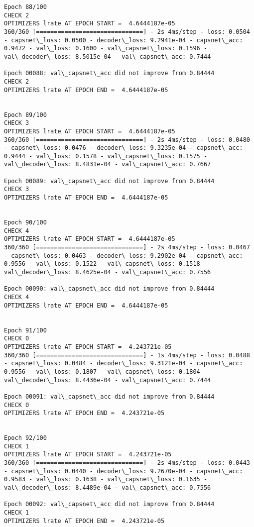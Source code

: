 \documentclass[11pt]{article}
\begin{document}
\begin{Verbatim}[commandchars=\\\{\}]
Epoch 88/100
CHECK 2
OPTIMIZERS lrate AT EPOCH START =  4.6444187e-05
360/360 [==============================] - 2s 4ms/step - loss: 0.0504 - capsnet\_loss: 0.0500 - decoder\_loss: 9.2941e-04 - capsnet\_acc: 0.9472 - val\_loss: 0.1600 - val\_capsnet\_loss: 0.1596 - val\_decoder\_loss: 8.5015e-04 - val\_capsnet\_acc: 0.7444

Epoch 00088: val\_capsnet\_acc did not improve from 0.84444
CHECK 2
OPTIMIZERS lrate AT EPOCH END =  4.6444187e-05 


Epoch 89/100
CHECK 3
OPTIMIZERS lrate AT EPOCH START =  4.6444187e-05
360/360 [==============================] - 2s 4ms/step - loss: 0.0480 - capsnet\_loss: 0.0476 - decoder\_loss: 9.3235e-04 - capsnet\_acc: 0.9444 - val\_loss: 0.1578 - val\_capsnet\_loss: 0.1575 - val\_decoder\_loss: 8.4831e-04 - val\_capsnet\_acc: 0.7667

Epoch 00089: val\_capsnet\_acc did not improve from 0.84444
CHECK 3
OPTIMIZERS lrate AT EPOCH END =  4.6444187e-05 


Epoch 90/100
CHECK 4
OPTIMIZERS lrate AT EPOCH START =  4.6444187e-05
360/360 [==============================] - 2s 4ms/step - loss: 0.0467 - capsnet\_loss: 0.0463 - decoder\_loss: 9.2902e-04 - capsnet\_acc: 0.9556 - val\_loss: 0.1522 - val\_capsnet\_loss: 0.1518 - val\_decoder\_loss: 8.4625e-04 - val\_capsnet\_acc: 0.7556

Epoch 00090: val\_capsnet\_acc did not improve from 0.84444
CHECK 4
OPTIMIZERS lrate AT EPOCH END =  4.6444187e-05 


Epoch 91/100
CHECK 0
OPTIMIZERS lrate AT EPOCH START =  4.243721e-05
360/360 [==============================] - 1s 4ms/step - loss: 0.0488 - capsnet\_loss: 0.0484 - decoder\_loss: 9.3121e-04 - capsnet\_acc: 0.9556 - val\_loss: 0.1807 - val\_capsnet\_loss: 0.1804 - val\_decoder\_loss: 8.4436e-04 - val\_capsnet\_acc: 0.7444

Epoch 00091: val\_capsnet\_acc did not improve from 0.84444
CHECK 0
OPTIMIZERS lrate AT EPOCH END =  4.243721e-05 


Epoch 92/100
CHECK 1
OPTIMIZERS lrate AT EPOCH START =  4.243721e-05
360/360 [==============================] - 2s 4ms/step - loss: 0.0443 - capsnet\_loss: 0.0440 - decoder\_loss: 9.2670e-04 - capsnet\_acc: 0.9583 - val\_loss: 0.1638 - val\_capsnet\_loss: 0.1635 - val\_decoder\_loss: 8.4489e-04 - val\_capsnet\_acc: 0.7556

Epoch 00092: val\_capsnet\_acc did not improve from 0.84444
CHECK 1
OPTIMIZERS lrate AT EPOCH END =  4.243721e-05 



\end{Verbatim}
\end{document}

